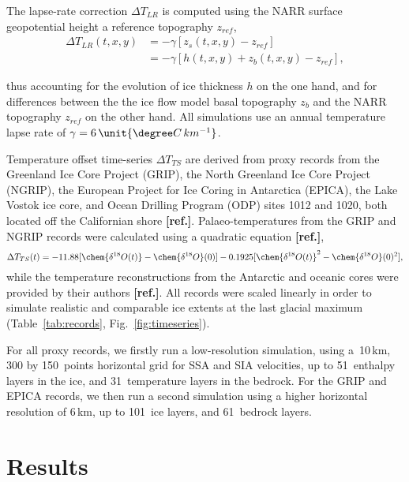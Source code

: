 \documentclass[tc, ms]{copernicus}
\newcommand{\aref}[0]{\textbf{[ref.]}}
\begin{document}
The lapse-rate correction ${\Delta}T_{LR}$ is computed using the NARR surface
geopotential height a reference topography $z_{ref}$,
\begin{align}
    {\Delta}T_{LR}(t, x, y) &= -\gamma [z_{s}(t, x, y)-z_{ref}] \\
                            &= -\gamma [h(t, x, y)+z_{b}(t, x, y)-z_{ref}],
\end{align}

thus accounting for the evolution of ice thickness $h$ on the one hand, and
for differences between the the ice flow model basal topography $z_{b}$ and the
NARR topography $z_{ref}$ on the other hand. All simulations use an annual temperature lapse rate of $\gamma = 6\,\unit{{\degree}C\,km^{-1}}$.

Temperature offset time-series ${\Delta}T_{TS}$ are derived from proxy records from
the Greenland Ice Core Project (GRIP), the North Greenland Ice Core Project
(NGRIP), the European Project for Ice Coring in Antarctica (EPICA), the Lake
Vostok ice core, and Ocean Drilling Program (ODP) sites 1012 and 1020, both
located off the Californian shore \aref. Palaeo-temperatures from the GRIP and
NGRIP records were calculated using a quadratic equation \aref,
\begin{equation}
    {\Delta}T_{TS}(t) = -11.88[\chem{\delta^{18}O(t)}-\chem{\delta^{18}O}(0)]
                        -0.1925[\chem{\delta^{18}O(t)}^2-\chem{\delta^{18}O}(0)^2],
\end{equation}
while the temperature reconstructions from the Antarctic and oceanic cores were
provided by their authors \aref. All records were scaled linearly in
order to simulate realistic and comparable ice extents at the last
glacial maximum (Table~\ref{tab:records}, Fig.~\ref{fig:timeseries}).

For all proxy records, we firstly run a low-resolution simulation, using
a~10\,\unit{km}, 300 by 150~points horizontal grid for SSA and SIA velocities,
up to 51~enthalpy layers in the ice, and 31~temperature layers in the bedrock.
For the GRIP and EPICA records, we then run a second simulation using a higher
horizontal resolution of 6\,\unit{km}, up to 101~ice layers, and 61~bedrock
layers.


\section{Results}
\label{sec:results}
\end{document}
